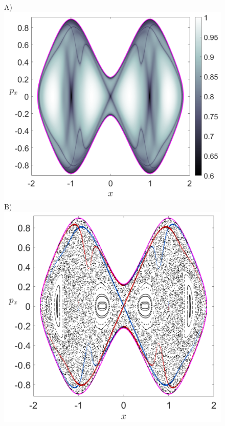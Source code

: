 \documentclass[10pt,aps,onecolumn,superscriptaddress]{revtex4-2}
\begin{document}
\begin{figure}[htbp]
	A)\includegraphics[scale=0.28]{H_-01_LD_tau_12_y_0.png}
	B)\includegraphics[scale=0.28]{H_-01_mani_tau_12_y_0.png}	

\end{figure}
\end{document}
